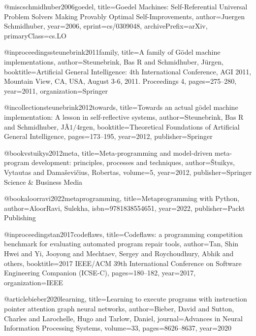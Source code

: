 
@misc{schmidhuber2006goedel,
      title={Goedel Machines: Self-Referential Universal Problem Solvers Making Provably Optimal Self-Improvements},
      author={Juergen Schmidhuber},
      year={2006},
      eprint={cs/0309048},
      archivePrefix={arXiv},
      primaryClass={cs.LO}
}


@inproceedings{steunebrink2011family,
  title={A family of G{\"o}del machine implementations},
  author={Steunebrink, Bas R and Schmidhuber, J{\"u}rgen},
  booktitle={Artificial General Intelligence: 4th International Conference, AGI 2011, Mountain View, CA, USA, August 3-6, 2011. Proceedings 4},
  pages={275--280},
  year={2011},
  organization={Springer}
}


@incollection{steunebrink2012towards,
  title={Towards an actual g{\"o}del machine implementation: A lesson in self-reflective systems},
  author={Steunebrink, Bas R and Schmidhuber, J{\~A}$1/4$rgen},
  booktitle={Theoretical Foundations of Artificial General Intelligence},
  pages={173--195},
  year={2012},
  publisher={Springer}
}

@book{vstuikys2012meta,
  title={Meta-programming and model-driven meta-program development: principles, processes and techniques},
  author={{\v{S}}tuikys, Vytautas and Dama{\v{s}}evi{\v{c}}ius, Robertas},
  volume={5},
  year={2012},
  publisher={Springer Science \& Business Media}
}

@book{aloorravi2022metaprogramming,
  title={Metaprogramming with Python},
  author={AloorRavi, Sulekha},
  isbn={9781838554651},
  year={2022},
  publisher={Packt Publishing}
}



@inproceedings{tan2017codeflaws,
  title={Codeflaws: a programming competition benchmark for evaluating automated program repair tools},
  author={Tan, Shin Hwei and Yi, Jooyong and Mechtaev, Sergey and Roychoudhury, Abhik and others},
  booktitle={2017 IEEE/ACM 39th International Conference on Software Engineering Companion (ICSE-C)},
  pages={180--182},
  year={2017},
  organization={IEEE}
}


@article{bieber2020learning,
  title={Learning to execute programs with instruction pointer attention graph neural networks},
  author={Bieber, David and Sutton, Charles and Larochelle, Hugo and Tarlow, Daniel},
  journal={Advances in Neural Information Processing Systems},
  volume={33},
  pages={8626--8637},
  year={2020}
}


